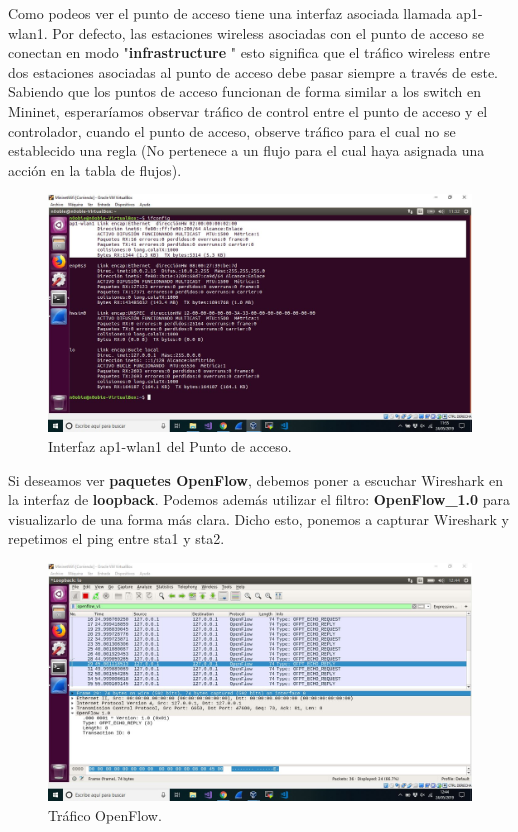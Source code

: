 Como podeos ver el punto de acceso tiene una interfaz asociada llamada ap1-wlan1. Por defecto, las estaciones wireless asociadas con el punto de acceso se conectan en modo "\textbf{infrastructure} " esto significa que el tráfico wireless entre dos estaciones asociadas al punto de acceso debe pasar siempre a través de este. Sabiendo que los puntos de acceso funcionan de forma similar a los switch en Mininet, esperaríamos observar tráfico de control entre el punto de acceso y el controlador, cuando el punto de acceso,  observe tráfico para el cual no se establecido una regla (No pertenece a un flujo para el cual haya asignada una acción en la tabla de flujos). 

\begin{figure}[!htb]
  \centering
    \includegraphics[width=0.9\linewidth]{./img/6.JPG}
    \caption{Interfaz ap1-wlan1 del Punto de acceso.}
  \label{fig:yo}
\end{figure}
\newpage
Si deseamos ver \textbf{paquetes OpenFlow}, debemos poner a escuchar Wireshark  en la interfaz de \textbf{loopback}. Podemos además utilizar el filtro: \textbf{OpenFlow\_1.0} para visualizarlo de una forma más clara. Dicho esto, ponemos a capturar Wireshark y repetimos el ping entre sta1 y sta2.
\begin{figure}[!htb]
  \centering
    \includegraphics[width=\linewidth]{./img/7.JPG}
    \caption{Tráfico OpenFlow.}
  \label{fig:yo}
\end{figure}
